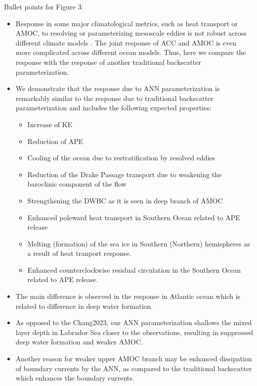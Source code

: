 \documentclass[draft]{agujournal2019}
\begin{document}
Bullet points for Figure 3:
\begin{itemize}
    \item Response in some major climatological metrics, such as heat transport or AMOC, to resolving or parameterizing mesoscale eddies is not robust across different climate models  \cite{hewitt2020resolving}. The joint response of ACC and AMOC is even more complicated across different ocean models. Thus, here we compare the response with the response of another traditional backscatter parameterization.
    \item We demonstrate that the response due to ANN parameterization is remarkably similar to the response due to traditional backscatter parameterization and includes the following expected properties:
    \begin{itemize}
        \item Increase of KE
        \item Reduction of APE
        \item Cooling of the ocean due to restratification by resolved eddies \cite{griffies2015impacts}
        \item Reduction of the Drake Passage transport due to weakening the baroclinic component of the flow
        \item Strengthening the DWBC as it is seen in deep branch of AMOC
        \item Enhanced poleward heat transport in Southern Ocean related to APE release
        \item Melting (formation) of the sea ice in Southern (Northern) hemispheres as a result of heat tranport response.
        \item Enhanced counterclockwise residual circulation in the Southern Ocean related to APE release.
    \end{itemize}
    \item The main difference is observed in the response in Atlantic ocean which is related to difference in deep water formation.
    \item As opposed to the Chang2023, our ANN parameterization shallows the mixed layer depth in Labrador Sea closer to the observations, resulting in suppressed deep water formation and weaker AMOC. 
    \item Another reason for weaker upper AMOC branch may be enhanced dissipation of boundary currents by the ANN, as compared to the traditional backscatter which enhances the boundary currents. 
    
\end{itemize}
\end{document}
